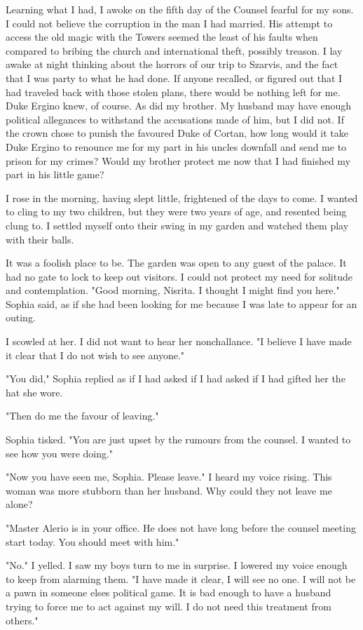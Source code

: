 \documentclass{article}
\begin{document}
Learning what I had, I awoke on the fifth day of the Counsel fearful for my sons. I could not believe the corruption in the man I had married. His attempt to access the old magic with the Towers seemed the least of his faults when compared to bribing the church and international theft, possibly treason. I lay awake at night thinking about the horrors of our trip to Szarvis, and the fact that I was party to what he had done. If anyone recalled, or figured out that I had traveled back with those stolen plans, there would be nothing left for me. Duke Ergino knew, of course. As did my brother. My husband may have enough political allegances to withstand the accusations made of him, but I did not. If the crown chose to punish the favoured Duke of Cortan, how long would it take Duke Ergino to renounce me for my part in his uncles downfall and send me to prison for my crimes? Would my brother protect me now that I had finished my part in his little game? 

I rose in the morning, having slept little, frightened of the days to come. I wanted to cling to my two children, but they were two years of age, and resented being clung to. I settled myself onto their swing in my garden and watched them play with their balls. 

It was a foolish place to be. The garden was open to any guest of the palace. It had no gate to lock to keep out visitors. I could not protect my need for solitude and contemplation. "Good morning, Nisrita. I thought I might find you here." Sophia said, as if she had been looking for me because I was late to appear for an outing.

I scowled at her. I did not want to hear her nonchallance. "I believe I have made it clear that I do not wish to see anyone."

"You did," Sophia replied as if I had asked if I had asked if I had gifted her the hat she wore.

"Then do me the favour of leaving."

Sophia tisked. "You are just upset by the rumours from the counsel. I wanted to see how you were doing."

"Now you have seen me, Sophia. Please leave." I heard my voice rising. This woman was more stubborn than her husband. Why could they not leave me alone?

"Master Alerio is in your office. He does not have long before the counsel meeting start today. You should meet with him."

"No." I yelled. I saw my boys turn to me in surprise. I lowered my voice enough to keep from alarming them. "I have made it clear, I will see no one. I will not be a pawn in someone elses political game. It is bad enough to have a husband trying to force me to act against my will. I do not need this treatment from others."
\end{document}
